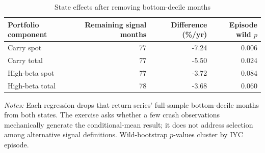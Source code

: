 \begin{table}[H]
\centering
\caption{State effects after removing bottom-decile months}\label{tab:inherited-excrash}
\small
\begin{tabular}{lrrr}
\toprule
Portfolio component & Remaining signal months & Difference (\%/yr) & Episode wild $p$ \\
\midrule
Carry spot       & 77 & -7.24 & 0.006 \\
Carry total      & 77 & -5.50 & 0.024 \\
High-beta spot   & 77 & -3.72 & 0.084 \\
High-beta total  & 78 & -3.68 & 0.060 \\
\bottomrule
\end{tabular}

\vspace{0.35em}
\begin{minipage}{0.94\textwidth}
\footnotesize\emph{Notes:} Each regression drops that return series' full-sample bottom-decile months from both states. The exercise asks whether a few crash observations mechanically generate the conditional-mean result; it does not address selection among alternative signal definitions. Wild-bootstrap $p$-values cluster by IYC episode.
\end{minipage}
\end{table}
